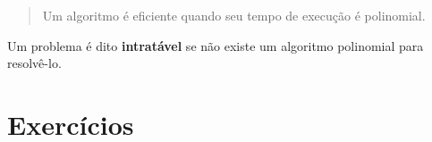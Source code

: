 \begin{quote}
Um algoritmo é eficiente quando seu tempo de execução é polinomial.
\end{quote}


Um problema é dito \textbf{intratável} se não existe um algoritmo polinomial para resolvê-lo.

\section{Exercícios}

